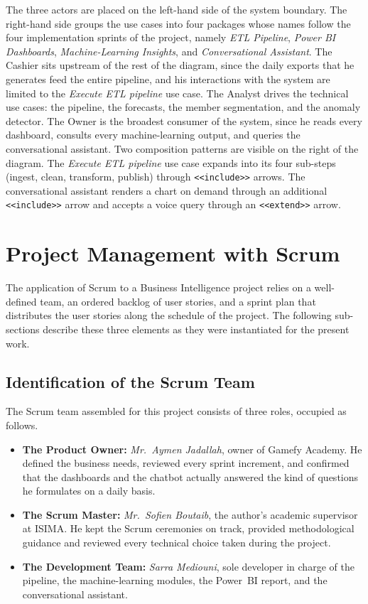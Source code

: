 \documentclass[12pt, a4paper]{report}
\begin{document}
The three actors are placed on the left-hand side of the system boundary.
The right-hand side groups the use cases into four packages whose names
follow the four implementation sprints of the project, namely
\textit{ETL Pipeline}, \textit{Power BI Dashboards}, \textit{Machine-Learning
Insights}, and \textit{Conversational Assistant}. The Cashier sits upstream
of the rest of the diagram, since the daily exports that he generates feed
the entire pipeline, and his interactions with the system are limited to the
\textit{Execute ETL pipeline} use case. The Analyst drives the technical use
cases: the pipeline, the forecasts, the member segmentation, and the anomaly
detector. The Owner is the broadest consumer of the system, since he reads
every dashboard, consults every machine-learning output, and queries the
conversational assistant. Two composition patterns are visible on the right
of the diagram. The \textit{Execute ETL pipeline} use case expands into its
four sub-steps (ingest, clean, transform, publish) through
\texttt{<<include>>} arrows. The conversational assistant renders a chart on
demand through an additional \texttt{<<include>>} arrow and accepts a voice
query through an \texttt{<<extend>>} arrow.

\section{Project Management with Scrum}

The application of Scrum to a Business Intelligence project relies on a
well-defined team, an ordered backlog of user stories, and a sprint plan
that distributes the user stories along the schedule of the project. The
following sub-sections describe these three elements as they were
instantiated for the present work.

\subsection{Identification of the Scrum Team}

The Scrum team assembled for this project consists of three roles, occupied
as follows.

\begin{itemize}
  \item \textbf{The Product Owner:} \textit{Mr.\ Aymen Jadallah}, owner of
        Gamefy Academy. He defined the business needs, reviewed every
        sprint increment, and confirmed that the dashboards and the
        chatbot actually answered the kind of questions he formulates on
        a daily basis.
  \item \textbf{The Scrum Master:} \textit{Mr.\ Sofien Boutaib}, the
        author's academic supervisor at ISIMA. He kept the Scrum
        ceremonies on track, provided methodological guidance and
        reviewed every technical choice taken during the project.
  \item \textbf{The Development Team:} \textit{Sarra Mediouni}, sole
        developer in charge of the pipeline, the machine-learning
        modules, the Power~BI report, and the conversational assistant.
\end{itemize}
\end{document}
